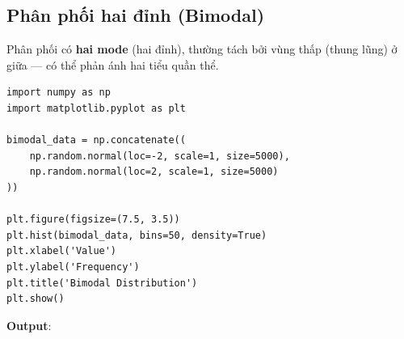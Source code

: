 \subsection{Phân phối hai đỉnh (Bimodal)}

\begin{dinhnghia}[title={Bimodal distribution}]
Phân phối có \textbf{hai mode} (hai đỉnh), thường tách bởi vùng thấp (thung lũng) ở giữa --- có thể phản ánh hai tiểu quần thể.
\end{dinhnghia}

\begin{vidu}[title={Hai cụm Gaussian}]
\begin{lstlisting}
import numpy as np
import matplotlib.pyplot as plt

bimodal_data = np.concatenate((
    np.random.normal(loc=-2, scale=1, size=5000),
    np.random.normal(loc=2, scale=1, size=5000)
))

plt.figure(figsize=(7.5, 3.5))
plt.hist(bimodal_data, bins=50, density=True)
plt.xlabel('Value')
plt.ylabel('Frequency')
plt.title('Bimodal Distribution')
plt.show()
\end{lstlisting}

\textbf{Output}:
\end{vidu}

